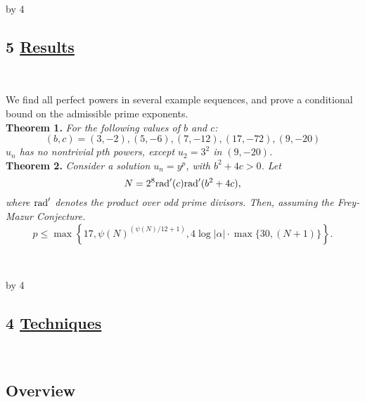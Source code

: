\documentclass[12pt]{scrartcl}
\newcommand{\rad}{{\rm{rad}}}
\def\anzspalten{4}
\newlength{\kastenwidth}
\newenvironment{kasten}{%
  \begin{lrbox}{\dummybox}%
    \begin{minipage}{0.96\linewidth}}%
    {\end{minipage}%
  \end{lrbox}%
  \raisebox{-\depth}{\psshadowbox[framesep=1em]{\usebox{\dummybox}}}\\[0.5em]}
\newenvironment{spalte}{%
  \setlength\kastenwidth{1.2\textwidth}
  \divide\kastenwidth by \anzspalten
  \begin{minipage}[t]{\kastenwidth}}{\end{minipage}\hfill}
\begin{document}
\begin{lrbox}{\spalten}
{\begin{spalte}
\begin{kasten}
 \section*{5 \hspace{0.1cm} {\color{red} \underline{Results
}}}
\end{kasten}

\begin{kasten}

We find all perfect powers in several example sequences, and prove a conditional bound on the admissible prime exponents. \\

\textbf{\large \color{blue} Theorem 1.} \textit{For the following values of $b$ and $c$:
\[ (b,c) = (3,-2), (5,-6), (7,-12), (17,-72), (9,-20) \]
$u_n$ has no nontrivial $p$th powers, except $u_2 = 3^2$ in $(9,-20)$.} \\

\textbf{\large\color{blue} Theorem 2.} \textit{Consider a solution $u_n = y^p$, with $b^2+4c >0$. Let \[ N = 2^8  {\rad}'(c)\rad'(b^2+4c),\]
where $\rad'$ denotes the product over odd prime divisors.  Then, assuming the Frey-Mazur Conjecture. 
\[ p \leq \max\left\{17,   \psi(N)^{(\psi(N)/12+1)}, 4\log{|\alpha|} \cdot  \max\{30,( N+1)\}  \right\}. \]}

\end{kasten}




\end{spalte}
    \begin{spalte}


\begin{kasten}
\section*{4 \hspace{0.1cm} {\color{red} 
\underline{Techniques}}}
\end{kasten}

\begin{kasten}

\subsection*{\color{blue} Overview}


\end{kasten}
\end{spalte}}
\end{lrbox}
\end{document}
